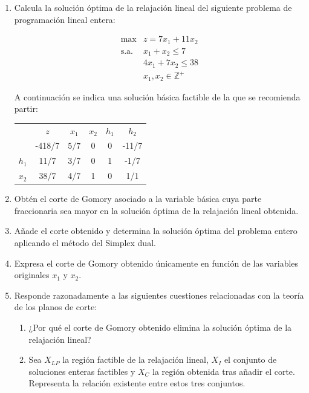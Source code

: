 
\begin{enumerate}

\item Calcula la solución óptima de la relajación lineal del siguiente problema de programación lineal entera:

\[
\begin{array}{ll}
\max & z = 7x_1 + 11x_2 \\[1ex]
\text{s.a.} &
x_1+x_2\le 7 \\[1ex]
&
4x_1+7x_2\le 38 \\[1ex]
&
x_1,x_2 \in \mathbb{Z}^+ 
\end{array}
\]

A continuación se indica una solución básica factible de la que se recomienda partir:

\begin{center}
\begin{tabular}{c|c|cccc|}
 & $z$ & $x_1$ & $x_2$ &  $h_1$ & $h_2$ \\ 
 & -418/7 & $5/7$ & 0  & 0 & -11/7 \\ 
\hline
$h_1$ & 11/7  & 3/7 & 0 & 1 & -1/7\\ 
$x_2$ & 38/7  & 4/7 & 1 & 0 & 1/1\\ 
\hline
\end{tabular}
\end{center}


\item Obtén el corte de Gomory asociado a la variable básica cuya parte fraccionaria sea mayor en la solución óptima de la relajación lineal obtenida.

\item Añade el corte obtenido y determina la solución óptima del problema entero aplicando el método del Simplex dual.

\item Expresa el corte de Gomory obtenido únicamente en función de las variables originales \(x_1\) y \(x_2\).

\item Responde razonadamente a las siguientes cuestiones relacionadas con la teoría de los planos de corte:

\begin{enumerate}
\item ¿Por qué el corte de Gomory obtenido elimina la solución óptima de la relajación lineal?


\item Sea \(X_{LP}\) la región factible de la relajación lineal, \(X_I\) el conjunto de soluciones enteras factibles y \(X_C\) la región obtenida tras añadir el corte. Representa la relación existente entre estos tres conjuntos.
\end{enumerate}

\end{enumerate}

